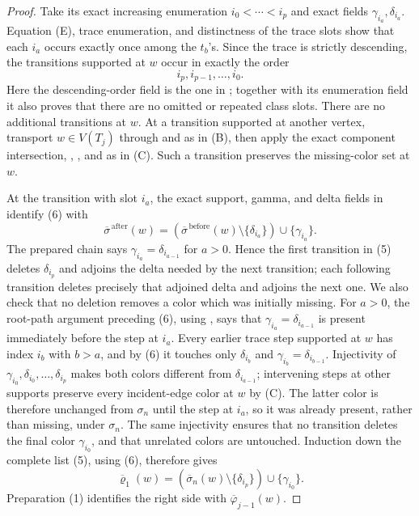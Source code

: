 \begin{proof}
Take its exact increasing enumeration
\(i_0<\cdots<i_p\) and exact fields
\(\gamma_{i_a},\delta_{i_a}\).  Equation (E), trace enumeration, and
distinctness of the trace slots show that each \(i_a\) occurs exactly
once among the \(t_b\)'s.  Since the trace is strictly descending, the
transitions supported at \(w\) occur in exactly the order
\[
                         i_p,i_{p-1},\ldots,i_0.               \tag{5}
\]
Here the descending-order field is the one in
; together with its enumeration
field it also proves that there are no omitted or repeated class slots.
There are no additional transitions at \(w\).  At a transition supported
at another vertex, transport \(w\in V(T_j)\) through
 and
 as in (B), then apply the exact component
intersection, ,
, and
 as in (C).  Such a transition preserves
the missing-color set at \(w\).

At the transition with slot \(i_a\), the exact support, gamma, and delta
fields in  identify (6) with
\[
 \overline{\sigma}^{\,\mathrm{after}}(w)
   =(\overline{\sigma}^{\,\mathrm{before}}(w)
        \setminus\{\delta_{i_a}\})\cup\{\gamma_{i_a}\}.
\]
The prepared chain says
\(\gamma_{i_a}=\delta_{i_{a-1}}\) for \(a>0\).  Hence the first
transition in (5) deletes \(\delta_{i_p}\) and adjoins the delta needed
by the next transition; each following transition deletes precisely that
adjoined delta and adjoins the next one.  We also check that no deletion
removes a color which was initially missing.  For \(a>0\), the root-path
argument preceding (6), using , says that
\(\gamma_{i_a}=\delta_{i_{a-1}}\) is present immediately before the
step at \(i_a\).  Every earlier trace step supported at \(w\) has
index \(i_b\) with \(b>a\), and by (6) it touches only
\(\delta_{i_b}\) and
\(\gamma_{i_b}=\delta_{i_{b-1}}\).  Injectivity of
\(\gamma_{i_0},\delta_{i_0},\ldots,\delta_{i_p}\) makes both colors
different from \(\delta_{i_{a-1}}\); intervening steps at other supports
preserve every incident-edge color at \(w\) by (C).  The latter color is
therefore unchanged from \(\sigma_n\) until the step at \(i_a\), so it was already
present, rather than missing, under \(\sigma_n\).  The same injectivity
ensures that no transition deletes the final color \(\gamma_{i_0}\),
and that unrelated colors are untouched.  Induction down the complete
list (5), using (6), therefore
gives
\[
 \overline{\varrho}_1(w)
   =(\overline{\sigma}_n(w)\setminus\{\delta_{i_p}\})
        \cup\{\gamma_{i_0}\}.                                \tag{7}
\]
Preparation (1) identifies the right side with
\(\overline{\varphi}_{j-1}(w)\).


\end{proof}
